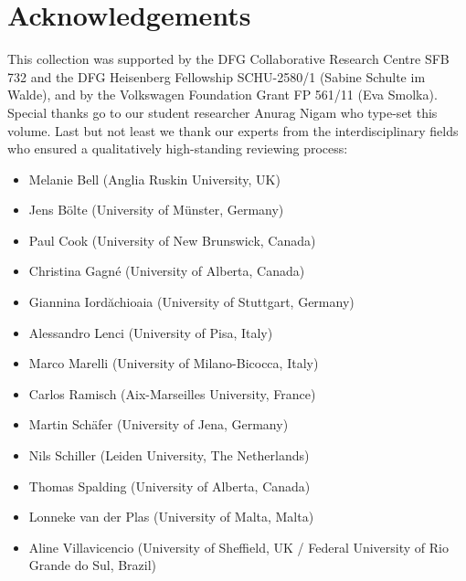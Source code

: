 \documentclass[output=paper]{langsci/langscibook}
\begin{document}
\section*{Acknowledgements}

This collection was supported by the DFG Collaborative Research Centre
SFB 732 and the DFG Heisenberg Fellowship SCHU-2580/1 (Sabine Schulte
im Walde), and by the Volkswagen Foundation Grant FP 561/11 (Eva
Smolka). Special thanks go to our student researcher Anurag Nigam who
type-set this volume.
%
Last but not least we thank our experts from the interdisciplinary
fields who ensured a qualitatively high-standing reviewing process:
\begin{itemize}
\item Melanie Bell (Anglia Ruskin University, UK)
\item Jens Bölte (University of Münster, Germany)
\item Paul Cook (University of New Brunswick, Canada)
\item Christina Gagné (University of Alberta, Canada)
\item Giannina Iord\u{a}chioaia (University of Stuttgart, Germany)
\item Alessandro Lenci (University of Pisa, Italy)
\item Marco Marelli (University of Milano-Bicocca, Italy)
\item Carlos Ramisch (Aix-Marseilles University, France)
\item Martin Schäfer (University of Jena, Germany)
\item Nils Schiller (Leiden University, The Netherlands)
\item Thomas Spalding (University of Alberta, Canada)
\item Lonneke van der Plas (University of Malta, Malta)
\item Aline Villavicencio (University of Sheffield, UK / Federal University of Rio Grande do Sul, Brazil)
\end{itemize}

\clearpage
{\sloppy\printbibliography[heading=subbibliography,notkeyword=this]}
\end{document}
